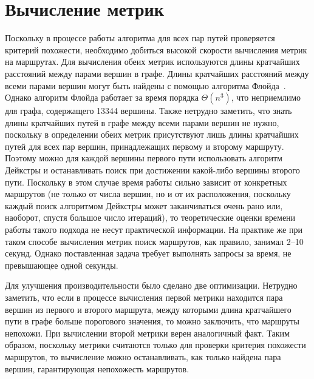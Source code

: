 \FloatBarrier

\section{Вычисление метрик}

Поскольку в процессе работы алгоритма для всех пар путей проверяется
критерий похожести, необходимо добиться высокой скорости вычисления
метрик на маршрутах. Для вычисления обеих метрик используются длины
кратчайших расстояний между парами вершин в графе. Длины кратчайших
расстояний между всеми парами вершин могут быть найдены с помощью
алгоритма Флойда~\cite{floyd1962algorithm}. Однако алгоритм Флойда
работает за время порядка $\Theta(n^3)$, что неприемлимо для графа,
содержащего 13344 вершины. Также нетрудно заметить, что знать длины
кратчайших путей в графе между всеми парами вершин не нужно, поскольку
в определении обеих метрик присутствуют лишь длины кратчайших путей
для всех пар вершин, принадлежащих первому и второму маршруту. Поэтому
можно для каждой вершины первого пути использовать алгоритм Дейкстры и
останавливать поиск при достижении какой-либо вершины второго пути.
Поскольку в этом случае время работы сильно зависит от конкретных
маршрутов (не только от числа вершин, но и от их расположения,
поскольку каждый поиск алгоритмом Дейкстры может заканчиваться очень
рано или, наоборот, спустя большое число итераций), то теоретические
оценки времени работы такого подхода не несут практической информации.
На практике же при таком способе вычисления метрик поиск маршрутов,
как правило, занимал 2--10 секунд. Однако поставленная задача требует
выполнять запросы за время, не превышающее одной секунды.

Для улучшения производительности было сделано две оптимизации.
Нетрудно заметить, что если в процессе вычисления первой метрики
находится пара вершин из первого и второго маршрута, между которыми
длина кратчайшего пути в графе больше порогового значения, то можно
заключить, что маршруты непохожи. При вычислении второй метрики верен
аналогичный факт. Таким образом, поскольку метрики считаются только
для проверки критерия похожести маршрутов, то вычисление можно
останавливать, как только найдена пара вершин, гарантирующая
непохожесть маршрутов.

